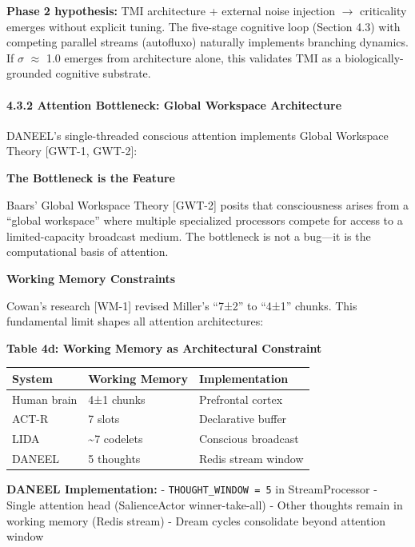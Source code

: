 \documentclass[
]{article}
\begin{document}
\textbf{Phase 2 hypothesis:} TMI architecture + external noise injection
$\rightarrow$ criticality emerges without explicit tuning. The five-stage cognitive
loop (Section 4.3) with competing parallel streams (autofluxo) naturally
implements branching dynamics. If $\sigma$ $\approx$ 1.0 emerges from architecture
alone, this validates TMI as a biologically-grounded cognitive
substrate.

\hypertarget{attention-bottleneck-global-workspace-architecture}{%
\paragraph{4.3.2 Attention Bottleneck: Global Workspace
Architecture}\label{attention-bottleneck-global-workspace-architecture}}

DANEEL's single-threaded conscious attention implements Global Workspace
Theory {[}GWT-1, GWT-2{]}:

\textbf{The Bottleneck is the Feature}

Baars' Global Workspace Theory {[}GWT-2{]} posits that consciousness
arises from a ``global workspace'' where multiple specialized processors
compete for access to a limited-capacity broadcast medium. The
bottleneck is not a bug---it is the computational basis of attention.

\textbf{Working Memory Constraints}

Cowan's research {[}WM-1{]} revised Miller's ``7±2'' to ``4±1'' chunks.
This fundamental limit shapes all attention architectures:

\textbf{Table 4d: Working Memory as Architectural Constraint}

\begin{longtable}[]{@{}lll@{}}
\toprule\noalign{}
System & Working Memory & Implementation \\
\midrule\noalign{}
\endhead
\bottomrule\noalign{}
\endlastfoot
Human brain & 4±1 chunks & Prefrontal cortex \\
ACT-R & 7 slots & Declarative buffer \\
LIDA & \textasciitilde7 codelets & Conscious broadcast \\
DANEEL & 5 thoughts & Redis stream window \\
\end{longtable}

\textbf{DANEEL Implementation:} - \texttt{THOUGHT\_WINDOW\ =\ 5} in
StreamProcessor - Single attention head (SalienceActor winner-take-all)
- Other thoughts remain in working memory (Redis stream) - Dream cycles
consolidate beyond attention window
\end{document}
